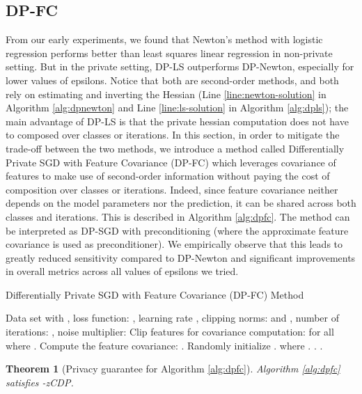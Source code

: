 \documentclass[letterpaper]{article} \usepackage{fullpage}
\newtheorem{thm}[lem]{Theorem}
\begin{document}
\subsection{DP-FC}
From our early experiments, we found that Newton's method with logistic regression performs better than least squares linear regression in non-private setting. But in the private setting, DP-LS outperforms DP-Newton, especially for lower values of epsilons. Notice that both are second-order methods, and both rely on estimating and inverting the Hessian (Line \ref{line:newton-solution} in Algorithm \ref{alg:dpnewton} and Line \ref{line:ls-solution} in Algorithm \ref{alg:dpls}); the main advantage of DP-LS is that the private hessian computation does not have to composed over classes or iterations. In this section, in order to mitigate the trade-off between the two methods, we introduce a method called Differentially Private SGD with Feature Covariance (DP-FC) which leverages covariance of features to make use of second-order information without paying the cost of composition over classes or iterations. Indeed, since feature covariance neither depends on the model parameters nor the prediction, it can be shared across both classes and iterations. This is described in Algorithm \ref{alg:dpfc}. The method can be interpreted as DP-SGD with preconditioning (where the approximate feature covariance  is used as preconditioner). We empirically observe that this leads to greatly reduced sensitivity compared to DP-Newton and significant improvements in overall metrics across all values of epsilons we tried.


\begin{algorithm}[ht]
\caption{Differentially Private SGD with Feature Covariance (DP-FC) Method}
\begin{algorithmic}[1]
\REQUIRE Data set  with , loss function: , learning rate , clipping norms:  and , number of iterations: , noise multiplier: 
\STATE Clip features for covariance computation:  for all  where .
\STATE Compute the feature covariance: .
\STATE  \label{line:Sigmafc}
\STATE Randomly initialize .
\FOR{}
{\STATE {} where {}.}
\STATE . \label{line:gradNfc}
{\STATE }
\ENDFOR
{ \label{eq:lastDPSGD}.}
\end{algorithmic}
\label{alg:dpfc}
\end{algorithm}

\begin{thm}[Privacy guarantee for Algorithm \ref{alg:dpfc}]
Algorithm \ref{alg:dpfc} satisfies -zCDP.
\end{thm}
\end{document}
